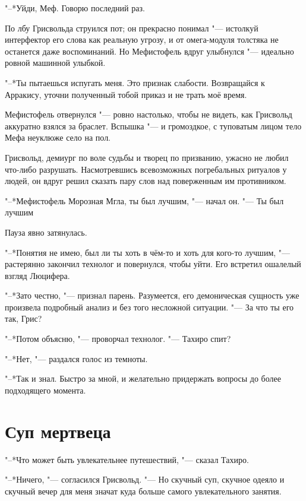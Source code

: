 \documentclass[a4paper,10pt]{book}
\newcommand{\mulang}[3]{#2}%
\newcommand{\ldotst}{\so{...}\xspace}
\begin{document}
"--*Уйди, Меф. Говорю последний раз.

По лбу Грисвольда струился пот; он прекрасно понимал "--- истолкуй интерфектор 
его слова как реальную угрозу, и от омега-модуля толстяка не останется даже 
воспоминаний. Но Мефистофель вдруг улыбнулся "--- идеально ровной машинной 
улыбкой.

"--*Ты пытаешься испугать меня. Это признак слабости. Возвращайся к Арракису, 
уточни полученный тобой приказ и не трать моё время.

Мефистофель отвернулся "--- ровно настолько, чтобы не видеть, как Грисвольд 
аккуратно взялся за браслет. Вспышка "--- и громоздкое, с туповатым лицом тело 
Мефа неуклюже село на пол.

Грисвольд, демиург по воле судьбы и творец по призванию, ужасно не любил 
что-либо 
разрушать. Насмотревшись всевозможных погребальных ритуалов у людей, он вдруг 
решил сказать пару слов над поверженным им противником.

"--*Мефистофель Морозная Мгла, ты был лучшим, "--- начал он. "--- Ты был 
лучшим\ldotst

Пауза явно затянулась.

\mulang{}{"--*Понятия не имею, был ли ты хоть в чём-то и хоть для кого-то лучшим, "--- растерянно закончил технолог и повернулся, чтобы уйти.}
{``I've no idea if you were good at something or for somebody,'' confused Griswold finished, then turned around to leave.}
Его встретил ошалелый взгляд Люцифера.

\mulang{}{"--*Зато честно, "--- признал парень.}
{``You're honest, anyway,'' Lu declared.}
Разумеется, его демоническая сущность уже произвела подробный анализ и без того несложной ситуации.
"--- За что ты его так, Грис?

"--*Потом объясню, "--- проворчал технолог. "--- Тахиро спит?

"--*Нет, "--- раздался голос из темноты.

"--*Так и знал. Быстро за мной, и желательно придержать вопросы до более 
подходящего момента.

\section{Суп мертвеца}

"--*Что может быть увлекательнее путешествий, "--- сказал Тахиро.

"--*Ничего, "--- согласился Грисвольд. "--- Но скучный суп, скучное одеяло и 
скучный вечер для меня значат куда больше самого увлекательного занятия.
\end{document}
